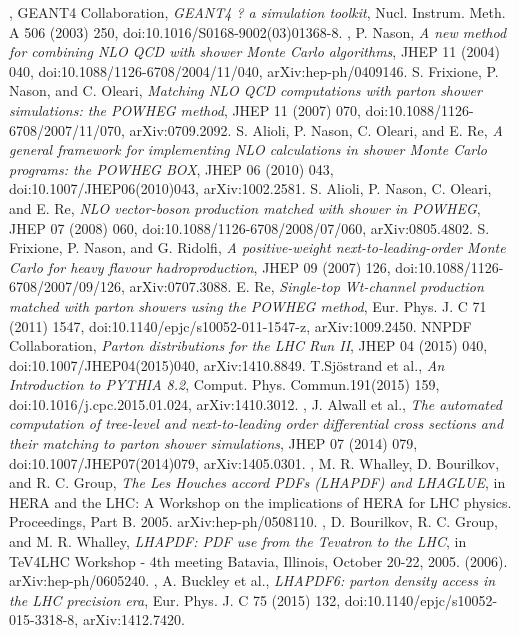 \begin{thebibliography}{999}
		, GEANT4 Collaboration, \emph{GEANT4 ? a simulation toolkit}, Nucl. Instrum. Meth. A 506 (2003) 250, doi:10.1016/S0168-9002(03)01368-8.
		, P. Nason, \emph{A new method for combining NLO QCD with shower Monte Carlo algorithms}, JHEP 11 (2004) 040, doi:10.1088/1126-6708/2004/11/040, arXiv:hep-ph/0409146.
		 S. Frixione, P. Nason, and C. Oleari, \emph{Matching NLO QCD computations with parton shower simulations: the POWHEG method}, JHEP 11 (2007) 070, doi:10.1088/1126-6708/2007/11/070, arXiv:0709.2092.
		 S. Alioli, P. Nason, C. Oleari, and E. Re, \emph{A general framework for implementing NLO calculations in shower Monte Carlo programs: the POWHEG BOX}, JHEP 06 (2010) 043, doi:10.1007/JHEP06(2010)043, arXiv:1002.2581.
		 S. Alioli, P. Nason, C. Oleari, and E. Re, \emph{NLO vector-boson production matched with shower in POWHEG}, JHEP 07 (2008) 060, doi:10.1088/1126-6708/2008/07/060, arXiv:0805.4802.
		 S. Frixione, P. Nason, and G. Ridolfi, \emph{A positive-weight next-to-leading-order Monte Carlo for heavy flavour hadroproduction}, JHEP 09 (2007) 126, doi:10.1088/1126-6708/2007/09/126, arXiv:0707.3088.
		 E. Re, \emph{Single-top Wt-channel production matched with parton showers using the POWHEG method}, Eur. Phys. J. C 71 (2011) 1547, doi:10.1140/epjc/s10052-011-1547-z, arXiv:1009.2450.
		 NNPDF Collaboration, \emph{Parton distributions for the LHC Run II}, JHEP 04 (2015) 040, doi:10.1007/JHEP04(2015)040, arXiv:1410.8849. 
		 T.Sj\"ostrand et al., \emph{An Introduction to PYTHIA 8.2}, Comput. Phys. Commun.191(2015) 159, doi:10.1016/j.cpc.2015.01.024, arXiv:1410.3012.
		, J. Alwall et al., \emph{The automated computation of tree-level and next-to-leading order differential cross sections and their matching to parton shower simulations}, JHEP 07 (2014) 079, doi:10.1007/JHEP07(2014)079, arXiv:1405.0301.
		, M. R. Whalley, D. Bourilkov, and R. C. Group, \emph{The Les Houches accord PDFs (LHAPDF) and LHAGLUE}, in HERA and the LHC: A Workshop on the implications of HERA for LHC physics. Proceedings, Part B. 2005. arXiv:hep-ph/0508110.
		, D. Bourilkov, R. C. Group, and M. R. Whalley, \emph{LHAPDF: PDF use from the Tevatron to the LHC}, in TeV4LHC Workshop - 4th meeting Batavia, Illinois, October 20-22, 2005. (2006). arXiv:hep-ph/0605240.
		, A. Buckley et al., \emph{LHAPDF6: parton density access in the LHC precision era}, Eur. Phys. J. C 75 (2015) 132, doi:10.1140/epjc/s10052-015-3318-8, arXiv:1412.7420.



	 \end{thebibliography}
\clearpage{\pagestyle{empty}\cleardoublepage}